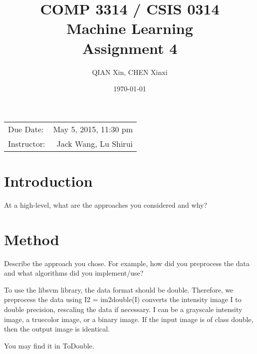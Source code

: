 \documentclass{article}
\title{ COMP 3314 / CSIS 0314\\ Machine Learning \\ Assignment 4} %
\author{QIAN Xin, CHEN Xinxi} %
\date{\today} %
\begin{document}
\maketitle %

\begin{center}
\begin{tabular}{l r}
Due Date: & May 5, 2015, 11:30 pm \\ %
Instructor: & Jack Wang, Lu Shirui %
\end{tabular}
\end{center}



\section{Introduction}

At a high-level, what are the approaches you considered and why?


\clearpage


\section{Method}

Describe the approach you chose. For example, how did you preprocess the
data and what algorithms did you implement/use?

To use the libsvm library, the data format should be double. Therefore, we preprocess the data using 
I2 = im2double(I) converts the intensity image I to double precision, rescaling the data if necessary. I can be a grayscale intensity image, a truecolor image, or a binary image.
If the input image is of class double, then the output image is identical.

You may find it in ToDouble.
\end{document}
